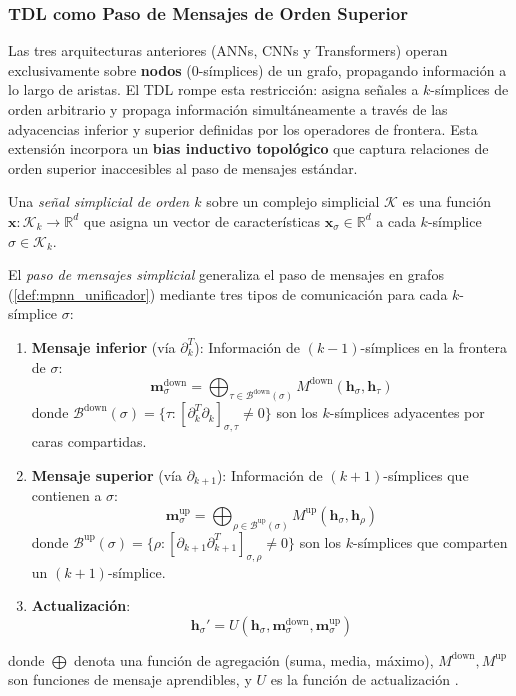 \subsubsection{TDL como Paso de Mensajes de Orden Superior}\label{subsubsec:tdl_mpnn_general}

Las tres arquitecturas anteriores (\glspl{ANN}, \glspl{CNN} y \glspl{Transformer}) operan exclusivamente sobre \textbf{nodos} ($0$-símplices) de un grafo, propagando información a lo largo de aristas. El \gls{TDL} rompe esta restricción: asigna señales a $k$-símplices de orden arbitrario y propaga información simultáneamente a través de las adyacencias inferior y superior definidas por los operadores de frontera. Esta extensión incorpora un \textbf{bias inductivo topológico} que captura relaciones de orden superior inaccesibles al paso de mensajes estándar.

\begin{definition}\label{def:senal_simplicial_gdl}
	Una \textit{señal simplicial de orden $k$} sobre un complejo simplicial $\mathcal{K}$ es una función $\mathbf{x}: \mathcal{K}_k \to \mathbb{R}^d$ que asigna un vector de características $\mathbf{x}_\sigma \in \mathbb{R}^d$ a cada $k$-símplice $\sigma \in \mathcal{K}_k$.
\end{definition}

\begin{definition}\label{def:mensaje_simplicial_gdl}
	El \textit{paso de mensajes simplicial} generaliza el paso de mensajes en grafos (\autoref{def:mpnn_unificador}) mediante tres tipos de comunicación para cada $k$-símplice $\sigma$:
	\begin{enumerate}
		\item \textbf{Mensaje inferior} (vía $\partial_k^T$): Información de $(k{-}1)$-símplices en la frontera de $\sigma$:
		\[
			\mathbf{m}_\sigma^{\mathrm{down}} = \bigoplus_{\tau \in \mathcal{B}^{\mathrm{down}}(\sigma)} M^{\mathrm{down}}\!\left(\mathbf{h}_\sigma, \mathbf{h}_\tau\right)
		\]
		donde $\mathcal{B}^{\mathrm{down}}(\sigma) = \{\tau : [\partial_k^T \partial_k]_{\sigma,\tau} \neq 0\}$ son los $k$-símplices adyacentes por caras compartidas.

		\item \textbf{Mensaje superior} (vía $\partial_{k+1}$): Información de $(k{+}1)$-símplices que contienen a $\sigma$:
		\[
			\mathbf{m}_\sigma^{\mathrm{up}} = \bigoplus_{\rho \in \mathcal{B}^{\mathrm{up}}(\sigma)} M^{\mathrm{up}}\!\left(\mathbf{h}_\sigma, \mathbf{h}_\rho\right)
		\]
		donde $\mathcal{B}^{\mathrm{up}}(\sigma) = \{\rho : [\partial_{k+1} \partial_{k+1}^T]_{\sigma,\rho} \neq 0\}$ son los $k$-símplices que comparten un $(k{+}1)$-símplice.

		\item \textbf{Actualización}:
		\[
			\mathbf{h}_\sigma' = U\!\left(\mathbf{h}_\sigma, \mathbf{m}_\sigma^{\mathrm{down}}, \mathbf{m}_\sigma^{\mathrm{up}}\right)
		\]
	\end{enumerate}
	donde $\bigoplus$ denota una función de agregación (suma, media, máximo), $M^{\mathrm{down}}, M^{\mathrm{up}}$ son funciones de mensaje aprendibles, y $U$ es la función de actualización \citep{bodnar2021weisfeiler}.
\end{definition}

